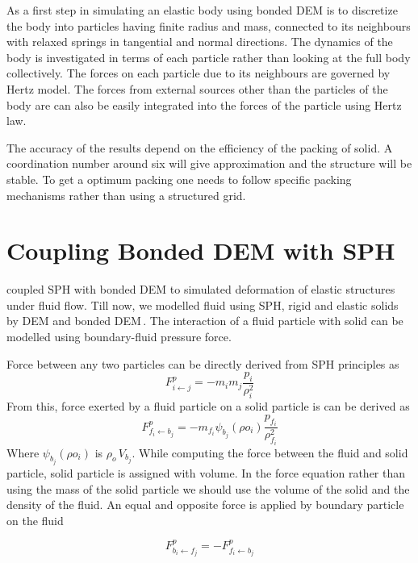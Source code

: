 As a first step in simulating an elastic body using bonded DEM is to discretize
the body into particles having finite radius and mass, connected to its
neighbours with relaxed springs in tangential and normal directions. The
dynamics of the body is investigated in terms of each particle rather than
looking at the full body collectively. The forces on each particle due to its
neighbours are governed by Hertz model. The forces from external sources other
than the particles of the body are can also be easily integrated into the forces
of the particle using Hertz law.


The accuracy of the results depend on the efficiency of the packing of solid.  A
coordination number around six will give approximation and the structure will be
stable. To get a optimum packing one needs to follow specific packing mechanisms
rather than using a structured grid.


\section{Coupling Bonded DEM with SPH}
\label{sec:coupling-bonded-dem}


\citeauthor{wu-2016-coupl-sph} coupled SPH with bonded DEM to simulated
deformation of elastic structures under fluid flow. Till now, we modelled fluid
using SPH, rigid and elastic solids by DEM and bonded DEM\,. The interaction of
a fluid particle with solid can be modelled using boundary-fluid pressure force.

Force between any two particles can be directly derived from SPH principles
as
\begin{equation}
  F^p_{i \leftarrow j} = -m_{i} m_{j} \frac{p_{i}}{\rho^2_{i}}
\end{equation}
From this, force exerted by a fluid particle on a solid particle is can be
derived as
\begin{equation}
  F^p_{f_i \leftarrow b_j} = -m_{f_i} \psi_{b_j}(\rho o_{i}) \frac{p_{f_i}}{\rho^2_{f_i}}
\end{equation}
Where $\psi_{b_j}(\rho o_{i}) $ is $\rho_o \, V_{b_j}$. While computing the
force between the fluid and solid particle, solid particle is assigned with
volume. In the force equation rather than using the mass of the solid particle
we should use the volume of the solid and the density of the fluid. An equal and
opposite force is applied by boundary particle on the fluid

\begin{equation}
  F^p_{b_i \leftarrow f_j} = -F^p_{f_i \leftarrow b_j}
\end{equation}




